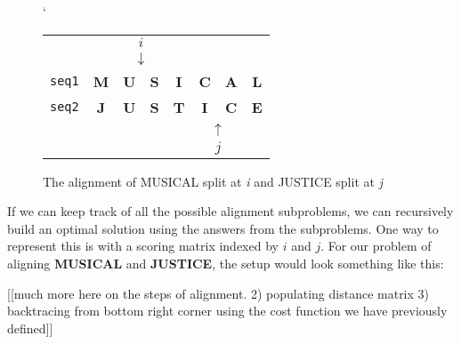 \begin{figure}[!h]`
\centering
\begin{tabular}{lccccccc}
   & {\color[HTML]{333333} \textbf{}} & \multicolumn{2}{c}{{\color[HTML]{333333} $i$}}          & {\color[HTML]{333333} \textbf{}} & {\color[HTML]{333333} \textbf{}} & {\color[HTML]{333333} \textbf{}} & {\color[HTML]{333333} \textbf{}} \\
   & {\color[HTML]{333333} \textbf{}} & \multicolumn{2}{c}{{\color[HTML]{333333} $\downarrow$}} & {\color[HTML]{333333} \textbf{}} & {\color[HTML]{333333} \textbf{}} & {\color[HTML]{333333} \textbf{}} & {\color[HTML]{333333} \textbf{}} \\
\texttt{seq1} & \textbf{M}                       & \textbf{U}                  & \textbf{S}                & \textbf{I}                       & \textbf{C}                       & \textbf{A}                       & \textbf{L}                       \\
\texttt{seq2} & \textbf{J}                       & \textbf{U}                  & \textbf{S}                & \textbf{T}                       & \textbf{I}                       & \textbf{C}                       & \textbf{E}                       \\
   &                                  &                             &                           &                                  & \multicolumn{2}{c}{$\uparrow$}                                      &                                  \\
   &                                  &                             &                           &                                  & \multicolumn{2}{c}{$j$}                                             &                                 
\end{tabular}
\caption{The alignment of MUSICAL split at \textit{i} and JUSTICE split at \textit{j}}
\label{indexed musical and justice}
\end{figure}

If we can keep track of all the possible alignment subproblems, we can recursively build an optimal solution using the answers from the subproblems. One way to represent this is with a scoring matrix indexed by $i$ and $j$. For our problem of aligning \textbf{MUSICAL} and \textbf{JUSTICE}, the setup would look something like this:

[[much more here on the steps of alignment. 2) populating distance matrix 3) backtracing from bottom right corner using the cost function we have previously defined]]

